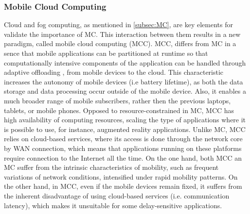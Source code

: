 \subsubsection{Mobile Cloud Computing}
Cloud and fog computing, as mentioned in \ref{subsec:MC}, are key elements for validate the importance of MC. This interaction between them results in a new paradigm, called mobile cloud computing (MCC). MCC, differs from MC in a sence that mobile applications can be partitioned at runtime so that computationally intensive components of the application can be handled through adaptive offloading \cite{shiraz2013review}, from mobile devices to the cloud. This characteristic increases the autonomy of mobile devices (i.e battery lifetime), as both the data storage and data processing occur outside of the mobile device. Also, it enables a much broader range of mobile subscribers, rather then the previous laptops, tablets, or mobile phones. Opposed to resource-constrained in MC, MCC has high availability of computing resources, scaling the type of applications where it is possible to use, for instance, augmented reality applications. Unlike MC, MCC relies on cloud-based services, where its access is done through the network core by WAN connection, which means that applications running on these platforms require connection to the Internet all the time. On the one hand, both MCC an MC suffer from the intrinsic characteristics of mobility, such as frequent variations of network conditions, intensified under rapid mobility patterns. On the other hand, in MCC, even if the mobile devices remain fixed, it suffers from the inherent disadvantage of using cloud-based services (i.e. communication latency), which makes it unsuitable for some delay-sensitive applications.

